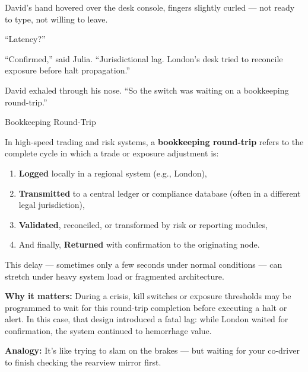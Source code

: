 David’s hand hovered over the desk console, fingers slightly curled — not ready to type, not willing to leave.

“Latency?”

“Confirmed,” said Julia. “Jurisdictional lag. London’s desk tried to reconcile exposure before halt propagation.”

David exhaled through his nose. “So the switch was waiting on a bookkeeping round-trip.”

\medskip

\begin{TechnicalSidebar}{Bookkeeping Round-Trip}

  In high-speed trading and risk systems, a \textbf{bookkeeping round-trip} refers to the complete cycle in which a 
  trade or exposure adjustment is:

  \medskip
  
  \begin{enumerate}
    \item \textbf{Logged} locally in a regional system (e.g., London),
    \item \textbf{Transmitted} to a central ledger or compliance database (often in a different legal jurisdiction),
    \item \textbf{Validated}, reconciled, or transformed by risk or reporting modules,
    \item And finally, \textbf{Returned} with confirmation to the originating node.
  \end{enumerate}

  \medskip
  
  This delay — sometimes only a few seconds under normal conditions — can stretch under heavy system load or fragmented 
  architecture.

  \medskip
  
  \textbf{Why it matters:} During a crisis, kill switches or exposure thresholds may be programmed to wait for this 
  round-trip completion before executing a halt or alert. In this case, that design introduced a fatal lag: while London 
  waited for confirmation, the system continued to hemorrhage value.

  \medskip
  
  \textbf{Analogy:} It’s like trying to slam on the brakes — but waiting for your co-driver to finish checking the 
  rearview mirror first.

\end{TechnicalSidebar}

\medskip

